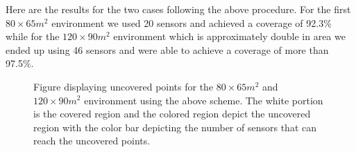 \documentclass{article}
\begin{document}
Here are the results for the two cases following the above procedure. For the first $80 \times 65 m^2$ environment we used 20 sensors and achieved a coverage of 92.3\% while for the $120 \times 90 m^2$ environment which is approximately double in area we ended up using 46 sensors and were able to achieve a coverage of more than 97.5\%. 

\begin{figure}[!h]
	\centering
	\caption{Figure displaying uncovered points for the $80 \times 65 m^2$ and $120 \times 90 m^2$ environment using the above scheme. The white portion is the covered region and the colored region depict the uncovered region with the color bar depicting the number of sensors that can reach the uncovered points.}
	\label{fig:uwb-u}
\end{figure}
\end{document}

